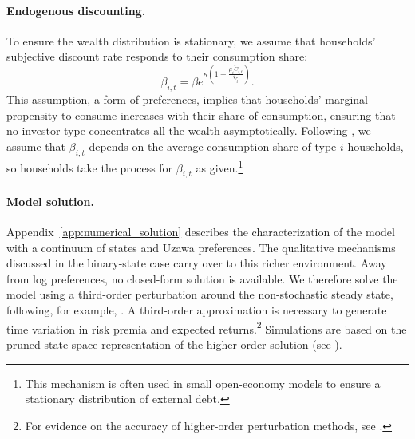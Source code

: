 \paragraph{Endogenous discounting.} 
To ensure the wealth distribution is stationary, we assume that households' subjective discount rate responds to their consumption share:
\begin{equation}
    \beta_{i,t} = \beta e^{\kappa \left(1 - \frac{\mu_i \tilde{C}_{i,t}}{\tilde{Y}_t}\right)}. 
\end{equation}
This assumption, a form of \citet{uzawa2017time} preferences, implies that households' marginal propensity to consume increases with their share of consumption, ensuring that no investor type concentrates all the wealth asymptotically.  Following \citet{schmitt2003closing}, we assume that $\beta_{i,t}$ depends on the average consumption share of type-$i$ households, so households take the process for $\beta_{i,t}$ as given.\footnote{This mechanism is often used in small open-economy models to ensure a stationary distribution of external debt.}

\paragraph{Model solution.}
Appendix~\ref{app:numerical_solution} describes the characterization of the model with a continuum of states and Uzawa preferences. The qualitative mechanisms discussed in the binary-state case carry over to this richer environment.
Away from log preferences, no closed-form solution is available. We therefore solve the model using a third-order perturbation around the non-stochastic steady state, following, for example, \citet{van2012term}. A third-order approximation is necessary to generate time variation in risk premia and expected returns.\footnote{For evidence on the accuracy of higher-order perturbation methods, see \citealt{caldara2012computing}.}
Simulations are based on the pruned state-space representation of the higher-order solution (see \citealt{andreasen2018pruned}).


